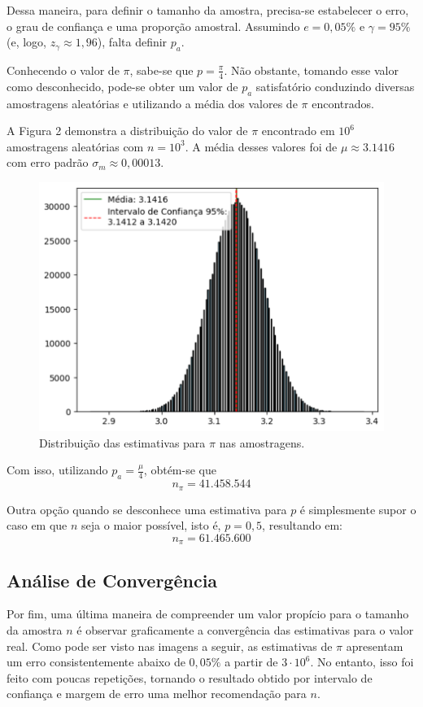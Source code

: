 \documentclass{article}
\begin{document}
Dessa maneira, para definir o tamanho da amostra, precisa-se estabelecer o erro, o grau de confiança e uma proporção amostral. Assumindo $e = 0,05\%$ e $\gamma = 95\%$ (e, logo, $z_\gamma \approx 1,96$), falta definir $p_a$.

Conhecendo o valor de $\pi$, sabe-se que $p = \frac{\pi}{4}$. Não obstante, tomando esse valor como desconhecido, pode-se obter um valor de $p_a$ satisfatório conduzindo diversas amostragens aleatórias e utilizando a média dos valores de $\pi$ encontrados.

A Figura 2 demonstra a distribuição do valor de $\pi$ encontrado em $10^6$ amostragens aleatórias com $n = 10^3$. A média desses valores foi de $\mu \approx 3.1416$ com erro padrão $\sigma_m \approx 0,00013$.

\begin{figure}[h]
\centering
\includegraphics[width=0.60\linewidth]{Figura 2.png}
\caption{\label{fig:Figura 2}Distribuição das estimativas para $\pi$ nas amostragens.}
\end{figure}

Com isso, utilizando $p_a = \frac{\mu}{4}$, obtém-se que
$$n_\pi = 41.458.544$$

Outra opção quando se desconhece uma estimativa para $p$ é simplesmente supor o caso em que $n$ seja o maior possível, isto é, $p = 0,5$, resultando em:
$$n_\pi = 61.465.600$$

\subsection{Análise de Convergência}

Por fim, uma última maneira de compreender um valor propício para o tamanho da amostra $n$ é observar graficamente a convergência das estimativas para o valor real. Como pode ser visto nas imagens a seguir, as estimativas de $\pi$ apresentam um erro consistentemente abaixo de $0,05\%$ a partir de $3 \cdot 10^6$. No entanto, isso foi feito com poucas repetições, tornando o resultado obtido por intervalo de confiança e margem de erro uma melhor recomendação para $n$.
\end{document}
